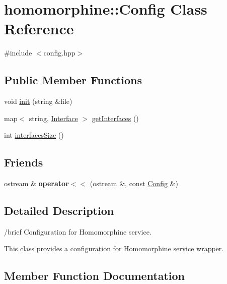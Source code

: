 \hypertarget{classhomomorphine_1_1_config}{}\section{homomorphine\+::Config Class Reference}
\label{classhomomorphine_1_1_config}


{\ttfamily \#include $<$config.\+hpp$>$}

\subsection*{Public Member Functions}
\begin{DoxyCompactItemize}
\item 
void \mbox{\hyperlink{classhomomorphine_1_1_config_ae3df94f615e3bc738525626875715a92}{init}} (string \&file)
\item 
map$<$ string, \mbox{\hyperlink{classhomomorphine_1_1_interface}{Interface}} $>$ \mbox{\hyperlink{classhomomorphine_1_1_config_a9286b3174aa24eddfe209fbe35fce303}{get\+Interfaces}} ()
\item 
int \mbox{\hyperlink{classhomomorphine_1_1_config_a48768be288a3e95be68488c02ce19601}{interfaces\+Size}} ()
\end{DoxyCompactItemize}
\subsection*{Friends}
\begin{DoxyCompactItemize}
\item 
\mbox{\label{classhomomorphine_1_1_config_ad47f2707e919427dd6f15ccf25608b32}} 
ostream \& {\bfseries operator$<$$<$} (ostream \&, const \mbox{\hyperlink{classhomomorphine_1_1_config}{Config}} \&)
\end{DoxyCompactItemize}


\subsection{Detailed Description}
/brief Configuration for Homomorphine service.

This class provides a configuration for Homomorphine service wrapper. 

\subsection{Member Function Documentation}
\mbox{\label{classhomomorphine_1_1_config_a9286b3174aa24eddfe209fbe35fce303}} 
